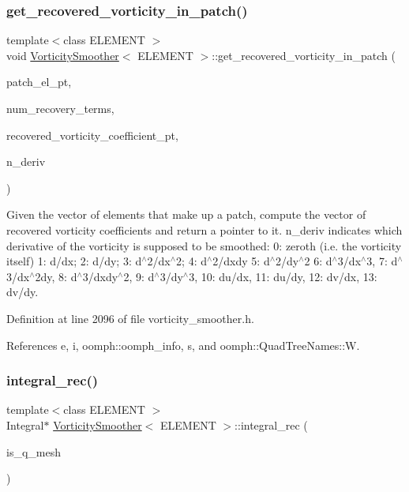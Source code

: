 \subsubsection{\texorpdfstring{get\+\_\+recovered\+\_\+vorticity\+\_\+in\+\_\+patch()}{get\_recovered\_vorticity\_in\_patch()}}
{\footnotesize\ttfamily template$<$class E\+L\+E\+M\+E\+NT $>$ \\
void \hyperlink{classVorticitySmoother}{Vorticity\+Smoother}$<$ E\+L\+E\+M\+E\+NT $>$\+::get\+\_\+recovered\+\_\+vorticity\+\_\+in\+\_\+patch (\begin{DoxyParamCaption}\item[{const Vector$<$ E\+L\+E\+M\+E\+NT $\ast$$>$ \&}]{patch\+\_\+el\+\_\+pt,  }\item[{const unsigned \&}]{num\+\_\+recovery\+\_\+terms,  }\item[{Vector$<$ double $>$ $\ast$\&}]{recovered\+\_\+vorticity\+\_\+coefficient\+\_\+pt,  }\item[{unsigned \&}]{n\+\_\+deriv }\end{DoxyParamCaption})\hspace{0.3cm}{\ttfamily [inline]}}



Given the vector of elements that make up a patch, compute the vector of recovered vorticity coefficients and return a pointer to it. n\+\_\+deriv indicates which derivative of the vorticity is supposed to be smoothed\+: 0\+: zeroth (i.\+e. the vorticity itself) 1\+: d/dx; 2\+: d/dy; 3\+: d$^\wedge$2/dx$^\wedge$2; 4\+: d$^\wedge$2/dxdy 5\+: d$^\wedge$2/dy$^\wedge$2 6\+: d$^\wedge$3/dx$^\wedge$3, 7\+: d$^\wedge$3/dx$^\wedge$2dy, 8\+: d$^\wedge$3/dxdy$^\wedge$2, 9\+: d$^\wedge$3/dy$^\wedge$3, 10\+: du/dx, 11\+: du/dy, 12\+: dv/dx, 13\+: dv/dy. 



Definition at line 2096 of file vorticity\+\_\+smoother.\+h.



References e, i, oomph\+::oomph\+\_\+info, s, and oomph\+::\+Quad\+Tree\+Names\+::W.

\mbox{\label{classVorticitySmoother_a5f27e46e120d81db35505b495a0e88c4}} 
\subsubsection{\texorpdfstring{integral\+\_\+rec()}{integral\_rec()}}
{\footnotesize\ttfamily template$<$class E\+L\+E\+M\+E\+NT $>$ \\
Integral$\ast$ \hyperlink{classVorticitySmoother}{Vorticity\+Smoother}$<$ E\+L\+E\+M\+E\+NT $>$\+::integral\+\_\+rec (\begin{DoxyParamCaption}\item[{const bool \&}]{is\+\_\+q\+\_\+mesh }\end{DoxyParamCaption})\hspace{0.3cm}{\ttfamily [inline]}}

